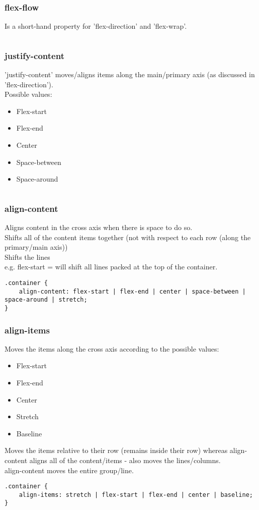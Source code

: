 \documentclass[]{article}
\newcommand{\<}{\guilsinglleft}
\renewcommand{\>}{\guilsinglright}
\begin{document}
\subsubsection{flex-flow}
Is a short-hand property for 'flex-direction' and 'flex-wrap'.
\begin{lstlisting}
\end{lstlisting}

\subsubsection{justify-content}
'justify-content' moves/aligns items along the main/primary axis (as discussed in 'flex-direction').
\\
Possible values:
\begin{itemize}
	\item Flex-start
	\item Flex-end
	\item Center
	\item Space-between
	\item Space-around
\end{itemize}
\begin{lstlisting}
\end{lstlisting}

\subsubsection{align-content}
Aligns content in the cross axis when there is space to do so. 
\\
Shifts all of the content items together (not with respect to each row (along the primary/main axis))
\\
Shifts the lines 
\\
e.g. flex-start = will shift all lines packed at the top of the container.
\begin{lstlisting}
.container {
	align-content: flex-start | flex-end | center | space-between | space-around | stretch;
}
\end{lstlisting}

\subsubsection{align-items}
Moves the items along the cross axis according to the possible values:
\begin{itemize}
	\item Flex-start
	\item Flex-end
	\item Center
	\item Stretch
	\item Baseline
\end{itemize}
Moves the items relative to their row (remains inside their row) whereas align-content aligns all of the content/items - also moves the lines/columns.
\\
align-content moves the entire group/line.
\begin{lstlisting}
.container {
	align-items: stretch | flex-start | flex-end | center | baseline;
}
\end{lstlisting}
\end{document}
